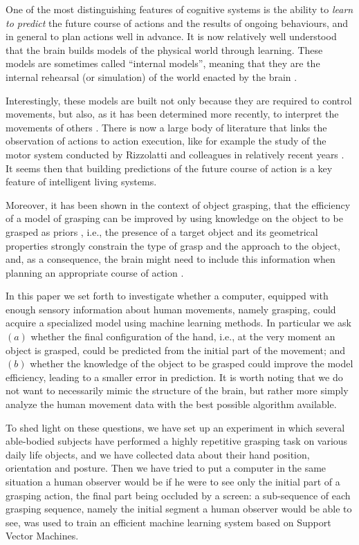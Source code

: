 One of the most distinguishing features of cognitive systems is the
ability to \emph{learn to predict} the future course of actions and
the results of ongoing behaviours, and in general to plan actions well
in advance. It is now relatively well understood that the brain builds
models of the physical world through learning. These models are
sometimes called ``internal models'', meaning that they are the
internal rehearsal (or simulation) of the world enacted by the brain
\cite{kawato-99}.

Interestingly, these models are built not only because they are
required to control movements, but also, as it has been determined
more recently, to interpret the movements of others \cite{wolpert-03,
mussaivaldi-00, lackner-98}. There is now a large body of literature
that links the observation of actions to action execution, like for
example the study of the motor system conducted by Rizzolatti and
colleagues in relatively recent years
\cite{rizzolatti-04,gallese-96,rizzolatti-01}. It seems then that
building predictions of the future course of action is a key feature 
of intelligent living systems.

Moreover, it has been shown in the context of object grasping, that
the efficiency of a model of grasping can be improved by using
knowledge on the object to be grasped as priors \cite{lopes-05,
metta-06}, i.e., the presence of a target object and its geometrical
properties strongly constrain the type of grasp and the approach to
the object, and, as a consequence, the brain might need to include
this information when planning an appropriate course of action
\cite{sakata-95}.

In this paper we set forth to investigate whether a computer, equipped
with enough sensory information about human movements, namely
grasping, could acquire a specialized model using machine
learning methods. In particular we ask $(a)$ whether the final
configuration of the hand, i.e., at the very moment an object is
grasped, could be predicted from the initial part of the movement; and
$(b)$ whether the knowledge of the object to be grasped could improve
the model efficiency, leading to a smaller error in prediction.
It is worth noting that we do not want to necessarily mimic the structure
of the brain, but rather more simply analyze the human movement data 
with the best possible algorithm available.

To shed light on these questions, we have set up an experiment in
which several able-bodied subjects have performed a highly repetitive
grasping task on various daily life objects, and we have collected
data about their hand position, orientation and posture. Then we have
tried to put a computer in the same situation a human observer would
be if he were to see only the initial part of a grasping action, the
final part being occluded by a screen: a sub-sequence of each grasping
sequence, namely the initial segment a human observer would be able to
see, was used to train an efficient machine learning system based on
Support Vector Machines.


